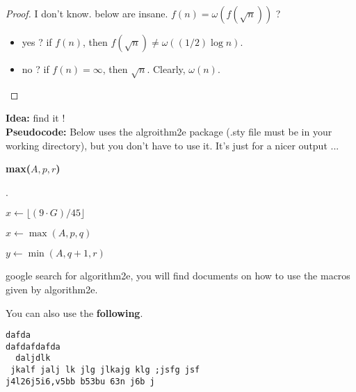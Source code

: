 \documentclass[11pt]{article}
\begin{document}
\bigskip


\begin{proof}
I don't know. below are insane. 
$f(n)=\omega(f(\sqrt{n}))$ ?

\begin{itemize}
\item
yes ?  if $f(n)$, then
$f(\sqrt{n})\neq \omega((1/2)\log n)$. 
\item
no ?  if $f(n)=\infty$, then
$\sqrt{n}$. Clearly, 
$\omega(n)$.
\end{itemize}
\end{proof}

\bigskip



{\bf Idea:} find it ! \\



{\bf Pseudocode:}  Below uses the algroithm2e package (.sty file must
be in your working directory), but you don't have to use it. It's just
for a nicer output ... 


\begin{algorithm}[H]
\NoCaptionOfAlgo
\DontPrintSemicolon
\caption{\bf max($A, p, r$)} 

\bigskip

.

\bigskip

$x \leftarrow \lfloor(9\cdot G)/45\rfloor$
\bigskip

$x \leftarrow \max(A, p, q)$

$y \leftarrow \min(A, q+1, r)$
\bigskip

\end{algorithm}

google search for algorithm2e, you will find documents on how to use
the macros given by algorithm2e.\\


\newpage

You can also use the {\bf following}. 

\begin{verbatim}
dafda
dafdafdafda
  daljdlk 
 jkalf jalj lk jlg jlkajg klg ;jsfg jsf 
j4l26j5i6,v5bb b53bu 63n j6b j
\end{verbatim}
\end{document}
